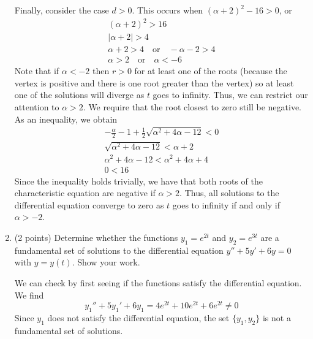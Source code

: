 \documentclass[11pt, titlepage]{article}
\begin{document}
\begin{enumerate}
\begin{solution}
                Finally, consider the case $d > 0$. This occurs when $(\alpha +
                2)^2 - 16 > 0$, or
                \begin{gather*}
                    (\alpha + 2)^2 > 16 \\
                    |\alpha + 2| > 4 \\
                    \alpha + 2 > 4 \quad \text{or} \quad -\alpha - 2 > 4 \\
                    \alpha > 2 \quad \text{or} \quad \alpha < -6
                \end{gather*}
                Note that if $\alpha < -2$ then $r > 0$ for at least one of the
                roots (because the vertex is positive and there is one root
                greater than the vertex) so at least one of the solutions will
                diverge as $t$ goes to infinity.
                Thus, we can restrict our attention to $\alpha >
                2$. We require that the root closest to zero still be negative.
                As an inequality, we obtain
                 \begin{gather*}
                    -\frac{\alpha}{2}-1 + \frac{1}{2}\sqrt{\alpha^2 + 4\alpha -
                    12} < 0 \\
                    \sqrt{\alpha^2 + 4\alpha -12} < \alpha + 2 \\
                    \alpha^2 + 4\alpha - 12 < \alpha^2 + 4\alpha + 4 \\
                    0 < 16
                \end{gather*}
                Since the inequality holds trivially, we have that both roots of
                the characteristic equation are negative if $\alpha > 2$. 
                Thus, all solutions to the differential equation converge to
                zero as $t$ goes to infinity if and only if $\alpha > -2$.
            \end{solution}
        \pagebreak

        \item (2 points) Determine whether the functions $y_1 = e^{2t}$ and $y_2
            = e^{3t}$ are a fundamental set of solutions to the differential
            equation $y'' + 5y' + 6y=0$ with $y = y(t)$. Show your work.

            \begin{solution}
                We can check by first seeing if the functions satisfy the
                differential equation. We find
                \[
                y_1'' + 5y_1' + 6y_1 = 4e^{2t} + 10e^{2t} + 6e^{2t} \neq 0
                \] 
                Since $y_1$ does not satisfy the differential equation, the set
                $\{y_1, y_2\}$ is not a fundamental set of solutions.
            \end{solution}
        \pagebreak


\end{enumerate}
\end{document}

